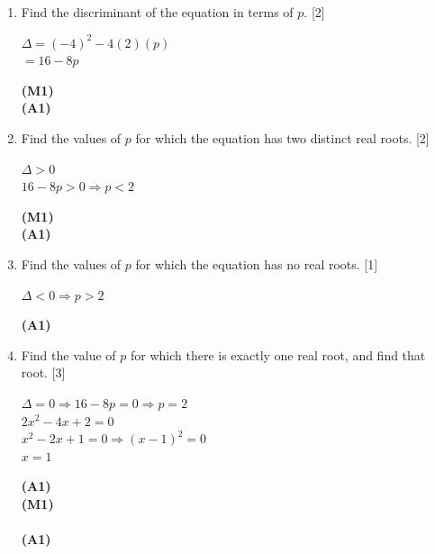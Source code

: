\documentclass[12pt, twoside]{article}
\begin{document}
\begin{enumerate}[itemsep=0.2cm]
\begin{enumerate}[itemsep=0.3cm]
  \item Find the discriminant of the equation in terms of $p$. \hfill [2]

  \begin{minipage}[t]{0.62\textwidth}
  $\Delta = (-4)^2 - 4(2)(p)$\\[0.15cm]
  $= 16 - 8p$
  \end{minipage}%
  \begin{minipage}[t]{0.35\textwidth}\raggedleft
  \textbf{(M1)}\\[0.15cm]
  \textbf{(A1)}
  \end{minipage}

  \medskip
  \item Find the values of $p$ for which the equation has two distinct real roots. \hfill [2]

  \begin{minipage}[t]{0.62\textwidth}
  $\Delta > 0$\\[0.15cm]
  $16 - 8p > 0 \Rightarrow p < 2$
  \end{minipage}%
  \begin{minipage}[t]{0.35\textwidth}\raggedleft
  \textbf{(M1)}\\[0.15cm]
  \textbf{(A1)}
  \end{minipage}

  \medskip
  \item Find the values of $p$ for which the equation has no real roots. \hfill [1]

  \begin{minipage}[t]{0.62\textwidth}
  $\Delta < 0 \Rightarrow p > 2$
  \end{minipage}%
  \begin{minipage}[t]{0.35\textwidth}\raggedleft
  \textbf{(A1)}
  \end{minipage}

  \medskip
  \item Find the value of $p$ for which there is exactly one real root,
        and find that root. \hfill [3]

  \begin{minipage}[t]{0.62\textwidth}
  $\Delta = 0 \Rightarrow 16 - 8p = 0 \Rightarrow p = 2$\\[0.15cm]
  $2x^2 - 4x + 2 = 0$\\[0.15cm]
  $x^2 - 2x + 1 = 0 \Rightarrow (x - 1)^2 = 0$\\[0.15cm]
  $x = 1$
  \end{minipage}%
  \begin{minipage}[t]{0.35\textwidth}\raggedleft
  \textbf{(A1)}\\[0.15cm]
  \textbf{(M1)}\\[0.15cm]
  ~\\[0.15cm]
  \textbf{(A1)}
  \end{minipage}
\end{enumerate}


\end{enumerate}
\end{document}
